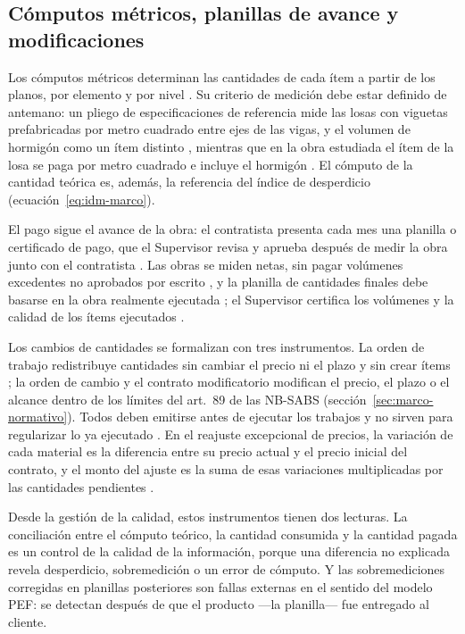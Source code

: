 \subsection{Cómputos métricos, planillas de avance y modificaciones}

Los cómputos métricos determinan las cantidades de cada ítem a partir de los planos, por elemento y por nivel \parencite[p.~254]{cocarico2022}. Su criterio de medición debe estar definido de antemano: un pliego de especificaciones de referencia mide las losas con viguetas prefabricadas por metro cuadrado entre ejes de las vigas, y el volumen de hormigón como un ítem distinto \parencite[p.~19]{ucb2025et}, mientras que en la obra estudiada el ítem de la losa se paga por metro cuadrado \parencite[p.~16]{uatf2025pao2} e incluye el hormigón \parencite[p.~3]{uatf_et}. El cómputo de la cantidad teórica es, además, la referencia del índice de desperdicio (ecuación~\ref{eq:idm-marco}).

El pago sigue el avance de la obra: el contratista presenta cada mes una planilla o certificado de pago, que el Supervisor revisa y aprueba \parencite[cláusula~28, p.~75]{dbc2022} después de medir la obra junto con el contratista \parencite[cláusula~26.3, p.~72]{dbc2022}. Las obras se miden netas, sin pagar volúmenes excedentes no aprobados por escrito \parencite[cláusula~27, p.~75]{dbc2022}, y la planilla de cantidades finales debe basarse en la obra realmente ejecutada \parencite[cláusula~38.1, p.~86]{dbc2022}; el Supervisor certifica los volúmenes y la calidad de los ítems ejecutados \parencite[p.~14]{cajias2023}.

Los cambios de cantidades se formalizan con tres instrumentos. La orden de trabajo redistribuye cantidades sin cambiar el precio ni el plazo y sin crear ítems \parencite[p.~20]{dbc2022}; la orden de cambio y el contrato modificatorio modifican el precio, el plazo o el alcance dentro de los límites del art.~89 de las NB-SABS (sección~\ref{sec:marco-normativo}). Todos deben emitirse antes de ejecutar los trabajos y no sirven para regularizar lo ya ejecutado \parencite[cláusula~30.5, p.~78]{dbc2022}. En el reajuste excepcional de precios, la variación de cada material es la diferencia entre su precio actual y el precio inicial del contrato, y el monto del ajuste es la suma de esas variaciones multiplicadas por las cantidades pendientes \parencite[art.~2]{ds5452_2025}.

Desde la gestión de la calidad, estos instrumentos tienen dos lecturas. La conciliación entre el cómputo teórico, la cantidad consumida y la cantidad pagada es un control de la calidad de la información, porque una diferencia no explicada revela desperdicio, sobremedición o un error de cómputo. Y las sobremediciones corregidas en planillas posteriores son fallas externas en el sentido del modelo PEF: se detectan después de que el producto ---la planilla--- fue entregado al cliente.


